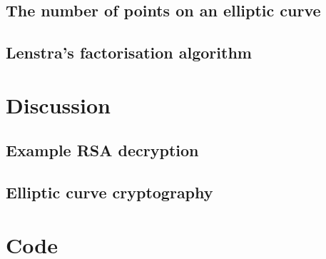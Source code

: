 \documentclass[a4paper,12pt,titlepage,oneside]{article}
\begin{document}
\subsection{The number of points on an elliptic curve}

\subsection{Lenstra's factorisation algorithm}

\clearpage

\section{Discussion}
\label{discussion-section}
\subsection{Example RSA decryption}

\subsection{Elliptic curve cryptography}

\clearpage

\appendix
\section{Code}
\label{codeappendix}

\clearpage


\end{document}
